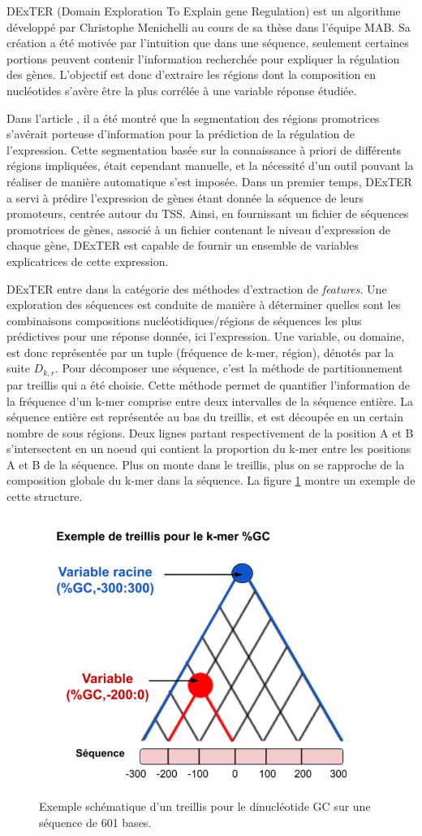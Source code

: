\documentclass[french]{llncs}
\begin{document}
DExTER (Domain Exploration To Explain gene Regulation) est un algorithme développé par Christophe Menichelli au cours de sa thèse dans l'équipe MAB. Sa création a été motivée par l'intuition que dans une séquence, seulement certaines portions peuvent contenir l'information recherchée pour expliquer la régulation des gènes. L'objectif est donc d'extraire les régions dont la composition en nucléotides s'avère être la plus corrélée à une variable réponse étudiée.

Dans l'article \cite{bessiere_probing_2018}, il a été montré que la segmentation des régions promotrices s'avérait porteuse d'information pour la prédiction de la régulation de l'expression. Cette segmentation basée sur la connaissance à priori de différents régions impliquées, était cependant manuelle, et la nécessité d'un outil pouvant la réaliser de manière automatique s'est imposée.
Dans un premier temps, DExTER a servi à prédire l'expression de gènes étant donnée la séquence de leurs promoteurs, centrée autour du TSS. Ainsi, en fournissant un fichier de séquences promotrices de gènes, associé à un fichier contenant le niveau d'expression de chaque gène, DExTER est capable de fournir un ensemble de variables explicatrices de cette expression. 

DExTER entre dans la catégorie des méthodes d'extraction de \textit{features}. Une exploration des séquences est conduite de manière à déterminer quelles sont les combinaisons compositions nucléotidiques/régions de séquences les plus prédictives pour une réponse donnée, ici l'expression. Une variable, ou domaine, est donc représentée par un tuple (fréquence de k-mer, région), dénotés par la suite $D_{k,r}$. Pour décomposer une séquence, c'est la méthode de  partitionnement par treillis qui a été choisie.
Cette méthode permet de quantifier l'information de la fréquence d'un k-mer comprise entre deux intervalles de la séquence entière. La séquence entière est représentée au bas du treillis, et est découpée en un certain nombre de sous régions. Deux lignes partant respectivement de la position A et B s'intersectent en un noeud qui contient la proportion du k-mer entre les positions A et B de la séquence. Plus on monte dans le treillis, plus on se rapproche de la composition globale du k-mer dans la séquence. La figure \ref{fig/treillis} montre un exemple de cette structure.
\begin{figure}[h]
\begin{center}
 	\includegraphics[width=0.5\linewidth]{Images_Dextra/Treillis.png}
 \caption{Exemple schématique d'un treillis pour le dinucléotide GC sur une séquence de 601 bases.} \label{fig/treillis}
\end{center}
\end{figure}
\end{document}
